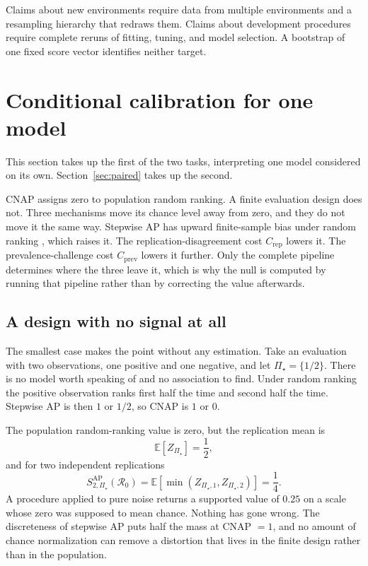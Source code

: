 \documentclass[11pt]{article}
\newcommand{\Regime}{\mathcal{R}}
\newcommand{\PSet}{\Pi_\star}
\newcommand{\E}{\mathbb{E}}
\theoremstyle{remark}
\begin{document}
Claims about new environments require data from multiple environments and a resampling hierarchy that redraws them. Claims about development procedures require complete reruns of fitting, tuning, and model selection. A bootstrap of one fixed score vector identifies neither target.

\section{Conditional calibration for one model}
\label{sec:calibration}

This section takes up the first of the two tasks, interpreting one model considered on its own. Section~\ref{sec:paired} takes up the second.

CNAP assigns zero to population random ranking. A finite evaluation design does not. Three mechanisms move its chance level away from zero, and they do not move it the same way. Stepwise AP has upward finite-sample bias under random ranking \cite{bestgen2015random}, which raises it. The replication-disagreement cost $C_{\mathrm{rep}}$ lowers it. The prevalence-challenge cost $C_{\mathrm{prev}}$ lowers it further. Only the complete pipeline determines where the three leave it, which is why the null is computed by running that pipeline rather than by correcting the value afterwards.

\subsection{A design with no signal at all}

The smallest case makes the point without any estimation. Take an evaluation with two observations, one positive and one negative, and let $\PSet=\{1/2\}$. There is no model worth speaking of and no association to find. Under random ranking the positive observation ranks first half the time and second half the time. Stepwise AP is then $1$ or $1/2$, so CNAP is $1$ or $0$.

The population random-ranking value is zero, but the replication mean is
\[
\E[Z_{\PSet}]
=
\frac12,
\]
and for two independent replications
\[
S_{2,\PSet}^{\mathrm{AP}}(\Regime_0)
=
\E[\min(Z_{\PSet,1},Z_{\PSet,2})]
=
\frac14.
\]
A procedure applied to pure noise returns a supported value of $0.25$ on a scale whose zero was supposed to mean chance. Nothing has gone wrong. The discreteness of stepwise AP puts half the mass at CNAP $=1$, and no amount of chance normalization can remove a distortion that lives in the finite design rather than in the population.
\end{document}
